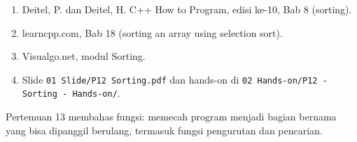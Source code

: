 \documentclass[a4paper]{article}
\begin{document}
\begin{enumerate}
\item Deitel, P. dan Deitel, H. C++ How to Program, edisi ke-10, Bab 8 (sorting).
\item learncpp.com, Bab 18 (sorting an array using selection sort).
\item Visualgo.net, modul Sorting.
\item Slide \texttt{01 Slide/P12 Sorting.pdf} dan hands-on di \texttt{02 Hands-on/P12 - Sorting - Hands-on/}.
\end{enumerate}
\begin{Penting}
Pertemuan 13 membahas fungsi: memecah program menjadi bagian bernama yang bisa dipanggil berulang, termasuk fungsi pengurutan dan pencarian.
\end{Penting}
\end{document}

